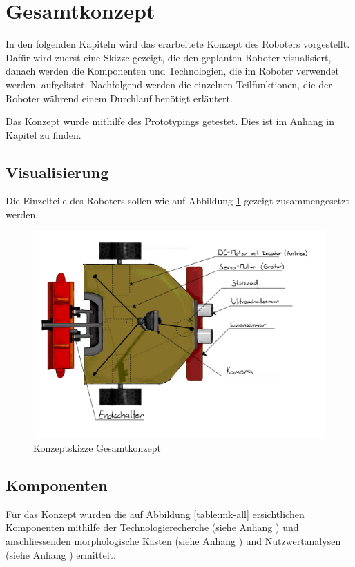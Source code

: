 \section{Gesamtkonzept}

In den folgenden Kapiteln wird das erarbeitete Konzept des Roboters vorgestellt. Dafür wird zuerst eine Skizze gezeigt, die den geplanten Roboter visualisiert, danach werden die Komponenten und Technologien, die im Roboter verwendet werden, aufgelistet. Nachfolgend werden die einzelnen Teilfunktionen, die der Roboter während einem Durchlauf benötigt erläutert. 

Das Konzept wurde mithilfe des Prototypings getestet. Dies ist im Anhang in Kapitel  zu finden.

\subsection{Visualisierung}

Die Einzelteile des Roboters sollen wie auf Abbildung \ref{fig:robot_concept-scetch_labeld} gezeigt zusammengesetzt werden.

\begin{figure}[H]
\centering
\includegraphics[width=\textwidth]{assets/gesamtkonzept/Skizze-Fahrzeugkonzept-Beschriftet.jpg}
\caption{Konzeptskizze Gesamtkonzept}
\label{fig:robot_concept-scetch_labeld}
\end{figure}

\subsection{Komponenten}
Für das Konzept wurden die auf Abbildung \ref{table:mk-all} ersichtlichen Komponenten mithilfe der Technologierecherche (siehe Anhang ) und anschliessenden morphologische Kästen (siehe Anhang ) und Nutzwertanalysen (siehe Anhang ) ermittelt. 

